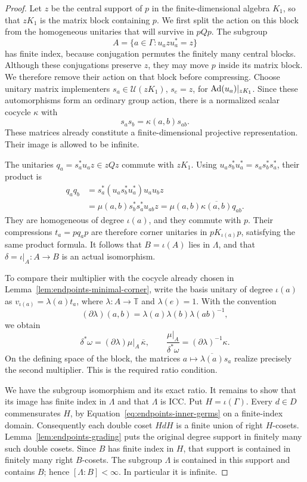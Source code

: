 \begin{proof}
Let \(z\) be the central support of \(p\) in the finite-dimensional
algebra \(K_1\), so that \(zK_1\) is the matrix block containing
\(p\). We first split the action on this block from the homogeneous
unitaries that will survive in \(pQp\).
The subgroup
\[
 A=\{a\in\Gamma:u_azu_a^*=z\}
\]
has finite index, because conjugation permutes the finitely many
central blocks. Although these conjugations preserve $z$, they may move
$p$ inside its matrix block. We therefore remove their action on that
block before compressing. Choose unitary matrix implementers
\(s_a\in\mathcal U(zK_1)\), \(s_e=z\), for
\(\operatorname{Ad}(u_a)|_{zK_1}\).  Since these automorphisms form an ordinary
group action, there is a normalized scalar cocycle \(\kappa\) with
\[
 s_as_b=\kappa(a,b)s_{ab}.
\]
These matrices already constitute a finite-dimensional projective
representation.  Their image is allowed to be infinite.

The unitaries \(q_a=s_a^*u_az\in zQz\) commute with \(zK_1\).
Using \(u_as_b^*u_a^*=s_as_b^*s_a^*\), their product is
\begin{align*}
 q_aq_b
  &=s_a^*(u_as_b^*u_a^*)u_au_bz\\
  &=\mu(a,b)s_b^*s_a^*u_{ab}z
    =\mu(a,b)\overline{\kappa(a,b)}q_{ab}.
\end{align*}
They are homogeneous of degree \(\iota(a)\), and they commute with
\(p\).  Their compressions \(t_a=pq_ap\) are therefore corner
unitaries in \(pK_{\iota(a)}p\), satisfying the same product formula.
It follows that \(B=\iota(A)\) lies in \(\Lambda\), and that
\(\delta=\iota|_A:A\to B\) is an actual isomorphism.

To compare their multiplier with the cocycle already chosen in
Lemma~\ref{lem:endpoints-minimal-corner}, write the basis unitary of
degree \(\iota(a)\) as
\(v_{\iota(a)}=\lambda(a)t_a\), where $\lambda:A\to\mathbb T$
and $\lambda(e)=1$. With the convention
\[
 (\partial\lambda)(a,b)=\lambda(a)\lambda(b)\lambda(ab)^{-1},
\]
we obtain
\begin{equation}
 \delta^*\omega=(\partial\lambda)\mu|_A\,\overline\kappa,
 \qquad
 \frac{\mu|_A}{\delta^*\omega}
       =(\partial\lambda)^{-1}\kappa.
 \label{eq:endpoints-ratio}
\end{equation}
On the defining space of the block, the matrices
\(a\mapsto\overline{\lambda(a)}s_a\) realize precisely the
second multiplier.  This is the required ratio condition.

We have the subgroup isomorphism and its exact ratio. It remains to
show that its image has finite index in \(\Lambda\) and that
\(\Lambda\) is ICC. Put \(H=\iota(\Gamma)\).
Every \(d\in D\) commensurates \(H\), by
Equation~\eqref{eq:endpoints-inner-germs} on a finite-index domain.
Consequently each double coset \(HdH\) is a finite union of right
\(H\)-cosets.  Lemma~\ref{lem:endpoints-grading} puts the original
degree support in finitely many such double cosets.  Since \(B\) has
finite index in \(H\), that support is contained in finitely many
right \(B\)-cosets.  The subgroup \(\Lambda\) is contained in this
support and contains \(B\); hence \([\Lambda:B]<\infty\).
In particular it is infinite.


\end{proof}
